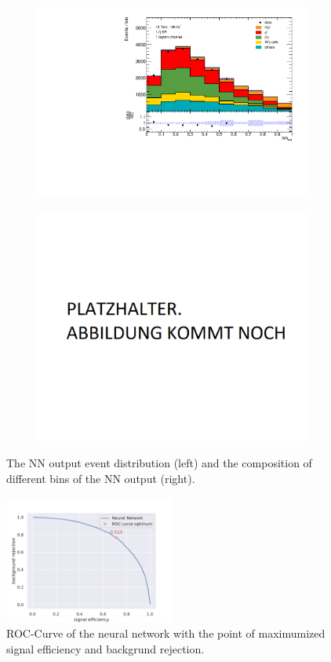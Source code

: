 \begin{figure}
    \centering
    \begin{subfigure}{.5\textwidth}
      \centering
      \includegraphics[width=\linewidth]{Plots/NN_out_mix_GANZ.pdf}
    \end{subfigure}%
    \begin{subfigure}{.5\textwidth}
      \centering
      \includegraphics[width=\linewidth]{Plots/Platzhalter.png}
    \end{subfigure}
    \caption{The NN output event distribution (left) and the composition of different bins of the NN output (right).}
    \label{fig:NNdistro}
\end{figure}
\begin{figure}
    \centering
    \includegraphics[width=0.5\textwidth]{Plots/ROC-Curve-fullt.pdf}
    \caption{ROC-Curve of the neural network with the point of maximumized signal efficiency and backgrund rejection.}
    \label{fig:rocfull}
\end{figure}

